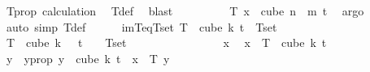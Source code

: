 \begin{isabellebody}
\ T{\isacharprime}{\kern0pt}{\isacharunderscore}{\kern0pt}prop\ calculation\ \isamarkupfalse%
\ T{\isacharprime}{\kern0pt}{\isacharunderscore}{\kern0pt}def\ \isamarkupfalse%
\ blast\isanewline
\ \ \ \ \ \ \isamarkupfalse%
\ \isamarkupfalse%
\ {\isachardoublequoteopen}T\ x\ {\isasymin}\ cube\ {\isacharparenleft}{\kern0pt}n\ {\isacharplus}{\kern0pt}\ m{\isacharparenright}{\kern0pt}\ {\isacharparenleft}{\kern0pt}t{\isacharplus}{\kern0pt}{}{\isacharparenright}{\kern0pt}{\isachardoublequoteclose}\ \isamarkupfalse%
\ argo\isanewline
\ \ \ \ \isamarkupfalse%
\ {\isacharparenleft}{\kern0pt}auto\ simp{\isacharcolon}{\kern0pt}\ T{\isacharunderscore}{\kern0pt}def{\isacharparenright}{\kern0pt}\isanewline
\isanewline
\ \ \ \ \isamarkupfalse%
\ im{\isacharunderscore}{\kern0pt}T{\isacharunderscore}{\kern0pt}eq{\isacharunderscore}{\kern0pt}Tset{\isacharcolon}{\kern0pt}\ {\isachardoublequoteopen}T\ {\isacharbackquote}{\kern0pt}\ cube\ {\isacharparenleft}{\kern0pt}k{\isacharplus}{\kern0pt}{}{\isacharparenright}{\kern0pt}\ {\isacharparenleft}{\kern0pt}t{\isacharplus}{\kern0pt}{}{\isacharparenright}{\kern0pt}\ {\isacharequal}{\kern0pt}\ Tset{\isachardoublequoteclose}\isanewline
\ \ \ \ \isamarkupfalse%
\isanewline
\ \ \ \ \ \ \isamarkupfalse%
\ {\isachardoublequoteopen}T\ {\isacharbackquote}{\kern0pt}\ cube\ {\isacharparenleft}{\kern0pt}k\ {\isacharplus}{\kern0pt}\ {}{\isacharparenright}{\kern0pt}\ {\isacharparenleft}{\kern0pt}t\ {\isacharplus}{\kern0pt}\ {}{\isacharparenright}{\kern0pt}\ {\isasymsubseteq}\ Tset{\isachardoublequoteclose}\isanewline
\ \ \ \ \ \ \isamarkupfalse%
\isanewline
\ \ \ \ \ \ \ \ \isamarkupfalse%
\ x\ \isamarkupfalse%
\ {\isachardoublequoteopen}x\ {\isasymin}\ T\ {\isacharbackquote}{\kern0pt}\ cube\ {\isacharparenleft}{\kern0pt}k{\isacharplus}{\kern0pt}{}{\isacharparenright}{\kern0pt}\ {\isacharparenleft}{\kern0pt}t{\isacharplus}{\kern0pt}{}{\isacharparenright}{\kern0pt}{\isachardoublequoteclose}\isanewline
\ \ \ \ \ \ \ \ \isamarkupfalse%
\ \isamarkupfalse%
\ y\ \ y{\isacharunderscore}{\kern0pt}prop{\isacharcolon}{\kern0pt}\ {\isachardoublequoteopen}y\ {\isasymin}\ cube\ {\isacharparenleft}{\kern0pt}k{\isacharplus}{\kern0pt}{}{\isacharparenright}{\kern0pt}\ {\isacharparenleft}{\kern0pt}t{\isacharplus}{\kern0pt}{}{\isacharparenright}{\kern0pt}\ {\isasymand}\ x\ {\isacharequal}{\kern0pt}\ T\ y{\isachardoublequoteclose}\ \isamarkupfalse%

\end{isabellebody}
